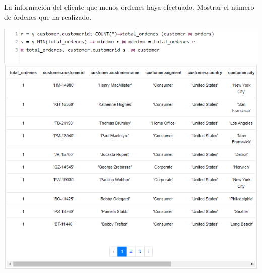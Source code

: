 La información del cliente que menos órdenes haya efectuado. Mostrar el número de órdenes que ha realizado.

\includegraphics[width= 15cm]{resources/2j-1.png}
\vspace{0.15cm}
\includegraphics[width= 15cm]{resources/2j-2.png}